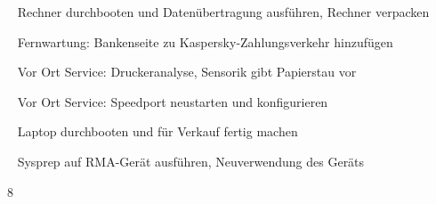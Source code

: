 {{	\textbullet~ Rechner durchbooten und Datenübertragung ausführen, Rechner verpacken\par
	\textbullet~ Fernwartung: Bankenseite zu Kaspersky-Zahlungsverkehr hinzufügen\par
	\textbullet~ Vor Ort Service: Druckeranalyse, Sensorik gibt Papierstau vor\par
	\textbullet~ Vor Ort Service: Speedport neustarten und konfigurieren\par
	\textbullet~ Laptop durchbooten und für Verkauf fertig machen\par
	\textbullet~ Sysprep auf RMA-Gerät ausführen, Neuverwendung des Geräts
	}{}{8}
}{}
\Unterschrift
\newpage

